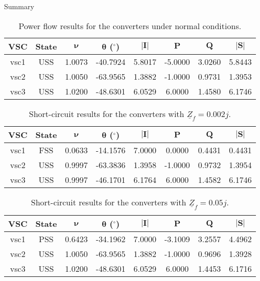 \begin{frame}{Summary}
\begin{table}[!htb]\centering \footnotesize
  \caption{Power flow results for the converters under normal conditions.}
  \begin{tabular}{cccccccc}
    \hline
    \textbf{VSC} & \textbf{State} & $\bm{\nu}$ & $\bm{\theta}$ ($^{\circ}$) & $|\bm{I}|$ & $\bm{P}$ & $\bm{Q}$ & $|\bm{S}|$ \\
    \hline
    \hline
    vsc1 & \cellcolor{gray!40}USS & 1.0073 & -40.7924 & \cellcolor{gray!40}5.8017 & -5.0000 & 3.0260 & 5.8443 \\
    vsc2 & \cellcolor{gray!40}USS & 1.0050 & -63.9565 & \cellcolor{gray!40}1.3882 & -1.0000 & 0.9731 & 1.3953 \\
    vsc3 & \cellcolor{gray!40}USS & 1.0200 & -48.6301 & \cellcolor{gray!40}6.0529 & 6.0000 & 1.4580 & 6.1746 \\
    \hline
  \end{tabular}
  \label{tab:2000_1}
\end{table}

\begin{table}[!htb]\centering \footnotesize
  \caption{Short-circuit results for the converters with $\underline{Z}_f=0.002j$.}
  \begin{tabular}{cccccccc}
    \hline
    \textbf{VSC} & \textbf{State} & $\bm{\nu}$ & $\bm{\theta}$ ($^{\circ}$) & $|\bm{I}|$ & $\bm{P}$ & $\bm{Q}$ & $|\bm{S}|$ \\
    \hline
    \hline
    vsc1 & \cellcolor{gray!40}FSS & 0.0633 & -14.1576 & \cellcolor{gray!40}7.0000 & 0.0000 & 0.4431 & 0.4431 \\
    vsc2 & \cellcolor{gray!40}USS & 0.9997 & -63.3836 & \cellcolor{gray!40}1.3958 & -1.0000 & 0.9732 & 1.3954 \\
    vsc3 & \cellcolor{gray!40}USS & 0.9997 & -46.1701 & \cellcolor{gray!40}6.1764 & 6.0000 & 1.4582 & 6.1746 \\
    \hline
  \end{tabular}
  \label{tab:2000_2}
\end{table}

\begin{table}[!htb]\centering \footnotesize
  \caption{Short-circuit results for the converters with $\underline{Z}_f=0.05j$.}
  \begin{tabular}{cccccccc}
    \hline
    \textbf{VSC} & \textbf{State} & $\bm{\nu}$ & $\bm{\theta}$ ($^{\circ}$) & $|\bm{I}|$ & $\bm{P}$ & $\bm{Q}$ & $|\bm{S}|$ \\
    \hline
    \hline
    vsc1 & \cellcolor{gray!40}PSS & 0.6423 & -34.1962 & \cellcolor{gray!40}7.0000 & -3.1009 & 3.2557 & 4.4962 \\
    vsc2 & \cellcolor{gray!40}USS & 1.0050 & -63.9565 & \cellcolor{gray!40}1.3882 & -1.0000 & 0.9696 & 1.3928 \\
    vsc3 & \cellcolor{gray!40}USS & 1.0200 & -48.6301 & \cellcolor{gray!40}6.0529 & 6.0000 & 1.4453 & 6.1716 \\
    \hline
  \end{tabular}
  \label{tab:2000_3}
\end{table}
\end{frame}

